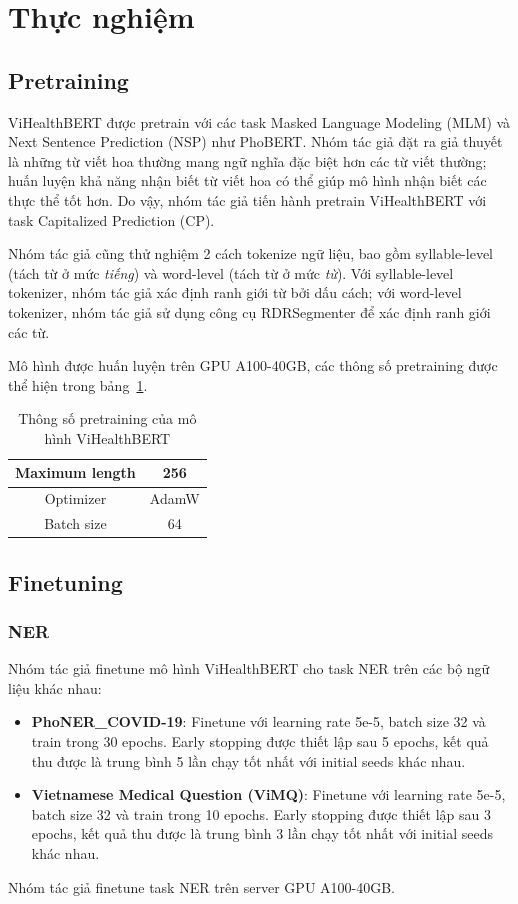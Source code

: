 \section{Thực nghiệm}
\subsection{Pretraining}
ViHealthBERT được pretrain với các task Masked Language Modeling (MLM) và Next Sentence Prediction (NSP) như PhoBERT. Nhóm tác giả đặt ra giả thuyết là những từ viết hoa thường mang ngữ nghĩa đặc biệt hơn các từ viết thường;  huấn luyện khả năng nhận biết từ viết hoa có thể giúp mô hình nhận biết các thực thể tốt hơn. Do vậy, nhóm tác giả tiến hành pretrain ViHealthBERT với task Capitalized Prediction (CP). 

Nhóm tác giả cũng thử nghiệm 2 cách tokenize ngữ liệu, bao gồm syllable-level (tách từ ở mức \textit{tiếng}) và word-level (tách từ ở mức \textit{từ}). Với syllable-level tokenizer, nhóm tác giả xác định ranh giới từ bởi dấu cách; với word-level tokenizer, nhóm tác giả sử dụng công cụ RDRSegmenter\cite{NguyenNVDJ2018} để xác định ranh giới các từ.

Mô hình được huấn luyện trên GPU A100-40GB, các thông số pretraining được thể hiện trong bảng~\ref{tab:pretraining-hyperparams}.

\begin{table}
\centering
\begin{tabular}{|c|c|}
\hline
Maximum length & 256 \\ \hline
Optimizer & AdamW \\ \hline
Batch size & 64 \\ \hline
\end{tabular}
\caption{Thông số pretraining của mô hình ViHealthBERT\cite{minh-EtAl:2022:LREC}}
\label{tab:pretraining-hyperparams}
\end{table}

\subsection{Finetuning}
\subsubsection{NER}
Nhóm tác giả finetune mô hình ViHealthBERT cho task NER trên các bộ ngữ liệu khác nhau:
\begin{itemize}
\item \textbf{PhoNER\_COVID-19}: Finetune với learning rate 5e-5, batch size 32 và train trong 30 epochs. Early stopping được thiết lập sau 5 epochs, kết quả thu được là trung bình 5 lần chạy tốt nhất với initial seeds khác nhau.
\item \textbf{Vietnamese Medical Question (ViMQ)}: Finetune với learning rate 5e-5, batch size 32 và train trong 10 epochs. Early stopping được thiết lập sau 3 epochs, kết quả thu được là trung bình 3 lần chạy tốt nhất với initial seeds khác nhau.
\end{itemize}
Nhóm tác giả finetune task NER trên server GPU A100-40GB.

